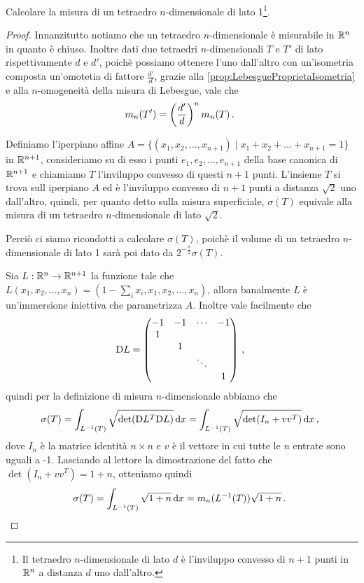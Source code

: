 \begin{exercise}\label{es:MisuraTetraedro}
	Calcolare la misura di un tetraedro $n$-dimensionale di lato 1\footnote{Il tetraedro $n$-dimensionale di lato $d$ è l'inviluppo convesso di $n+1$ punti in $\mathbb R^n$ a distanza $d$ uno dall'altro.}.
\end{exercise}
\begin{proof}
	Innanzitutto notiamo che un tetraedro $n$-dimensionale è misurabile in $\mathbb R^n$ in quanto è chiuso.
	Inoltre  dati due tetraedri $n$-dimensionali $T$ e $T'$ di lato rispettivamente $d$ e $d'$, poichè possiamo ottenere l'uno dall'altro con un'isometria composta un'omotetia di fattore $\frac{d'}d$, grazie alla \cref{prop:LebesgueProprietaIsometria} e alla $n$-omogeneità della misura di Lebesgue, vale che 
	\begin{equation*} 
		m_n(T')=\left(\frac{d'}{d}\right)^nm_n(T)\, \text{. }
	\end{equation*}

	Definiamo l'iperpiano affine $A=\{(x_1,x_2,\ldots,x_{n+1}) \mid x_1+x_2+\ldots +x_{n+1}=1\}$ in $\mathbb R^{n+1}$, consideriamo su di esso i punti $e_1,e_2,\ldots,e_{n+1}$ della base canonica di $\mathbb R^{n+1}$ e chiamiamo $T$ l'inviluppo convesso di questi $n+1$ punti. 
	L'insieme $T$ si trova sull iperpiano $A$ ed è l'inviluppo convesso di $n+1$ punti a distanza $\sqrt 2$ uno dall'altro, quindi, per quanto detto sulla misura superficiale, $\sigma(T)$ equivale alla misura di un tetraedro $n$-dimensionale di lato $\sqrt 2$. %

	Perciò ci siamo ricondotti a calcolare $\sigma(T)$, poichè il volume di un tetraedro $n$-dimensionale di lato 1 sarà poi dato da $2^{-\frac n2}\sigma(T)$.

	Sia $L:\mathbb R^n\to\mathbb R^{n+1}$ la funzione tale che $L(x_1,x_2,\ldots,x_n)=(1-\sum_ix_i,x_1,x_2,\ldots,x_n)$, allora banalmente $L$ è un'immersione iniettiva che parametrizza $A$. Inoltre vale facilmente che 
	\begin{equation*}
		\mathrm D L=\begin{pmatrix}
		        	-1	& -1 & \cdots & -1\\
					1 & & & \\
					 & 1 & & \\
					 & &\ddots& \\
					 & & & 1
		        \end{pmatrix}\, \text{, }
	\end{equation*}
	quindi per la definizione di misura $n$-dimensionale abbiamo che
	\begin{equation*}
		\sigma(T)=\int_{L^{-1}(T)}\sqrt{\det(\mathrm D L^T\mathrm D L)}\,\mathrm d x=\int_{L^{-1}(T)}\sqrt{\det(I_n+vv^T)}\,\mathrm d x\, \text{, }
	\end{equation*}
	dove $I_n$ è la matrice identità $n\times n$ e $v$ è il vettore in cui tutte le $n$ entrate sono uguali a -1. Lasciando al lettore la dimostrazione del fatto che $\det(I_n+vv^T)=1+n$, otteniamo quindi %
	\begin{equation*}
		\sigma(T)=\int_{L^{-1}(T)}\sqrt{1+n}\,\mathrm d x=m_n(L^{-1}(T))\sqrt{1+n}\, \text{. }
	\end{equation*}


\end{proof}
